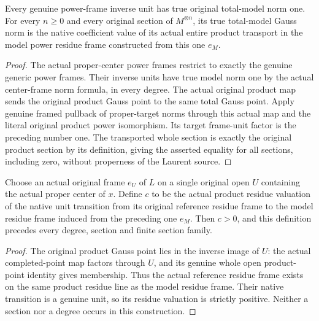 \begin{theorem}\label{thm:native-tc-coherent-frame-all-section-norm}
\leanok
{}
Every genuine power-frame inverse unit has true original
total-model norm one. For every $n\geq0$ and every original
section of $M^{\otimes n}$, its true total-model Gauss norm is
the native coefficient value of its actual entire product
transport in the model power residue frame constructed from
this one $e_M$.
\end{theorem}
\begin{proof}
The actual proper-center power frames restrict to exactly the
genuine generic power frames. Their inverse units have true
model norm one by the actual center-frame norm formula, in every
degree. The actual original product map sends the original
product Gauss point to the same total Gauss point. Apply genuine
framed pullback of proper-target norms through this actual map
and the literal original product power isomorphism. Its target
frame-unit factor is the preceding number one. The transported
whole section is exactly the original product section by its
definition, giving the asserted equality for all sections,
including zero, without properness of the Laurent source.
\end{proof}

\begin{definition}\label{def:native-tc-coherent-positive-norm-factor}
\leanok
{}
Choose an actual original frame $e_U$ of $L$ on a single original
open $U$ containing the actual proper center of $x$. Define $c$
to be the actual product residue valuation of the native unit
transition from its original reference residue frame to the
model residue frame induced from the preceding one $e_M$.
Then $c>0$, and this definition precedes every degree, section
and finite section family.
\end{definition}
\begin{proof}
The original product Gauss point lies in the inverse image of
$U$: the actual completed-point map factors through $U$, and
its genuine whole open product-point identity gives membership.
Thus the actual reference residue frame exists on the same
product residue line as the model residue frame. Their native
transition is a genuine unit, so its residue valuation is
strictly positive. Neither a section nor a degree occurs in
this construction.
\end{proof}

